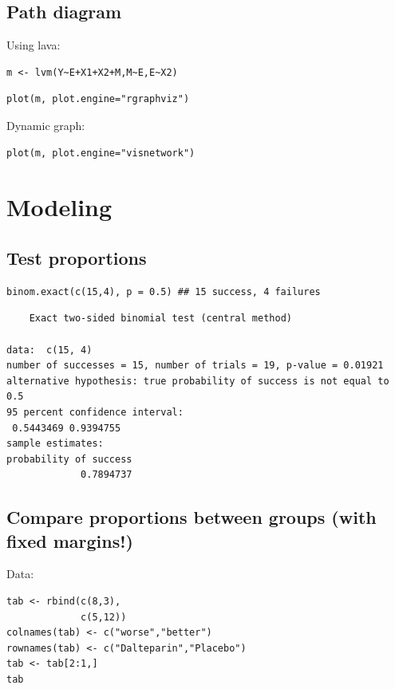 \documentclass{article}
\begin{document}
\subsection{Path diagram}
\label{sec:orge8a8306}
Using lava:
\lstset{language=r,label= ,caption= ,captionpos=b,numbers=none}
\begin{lstlisting}
m <- lvm(Y~E+X1+X2+M,M~E,E~X2)
\end{lstlisting}

\lstset{language=r,label= ,caption= ,captionpos=b,numbers=none}
\begin{lstlisting}
plot(m, plot.engine="rgraphviz")
\end{lstlisting}

Dynamic graph:
\lstset{language=r,label= ,caption= ,captionpos=b,numbers=none}
\begin{lstlisting}
plot(m, plot.engine="visnetwork")
\end{lstlisting}

\section{Modeling}
\label{sec:org167e87d}
\subsection{Test proportions}
\label{sec:orga780cf4}
\lstset{language=r,label= ,caption= ,captionpos=b,numbers=none}
\begin{lstlisting}
binom.exact(c(15,4), p = 0.5) ## 15 success, 4 failures
\end{lstlisting}

\begin{verbatim}
	Exact two-sided binomial test (central method)

data:  c(15, 4)
number of successes = 15, number of trials = 19, p-value = 0.01921
alternative hypothesis: true probability of success is not equal to 0.5
95 percent confidence interval:
 0.5443469 0.9394755
sample estimates:
probability of success 
             0.7894737
\end{verbatim}

\subsection{Compare proportions between groups (with fixed margins!)}
\label{sec:org7c43745}

Data:
\lstset{language=r,label= ,caption= ,captionpos=b,numbers=none}
\begin{lstlisting}
tab <- rbind(c(8,3),
			 c(5,12))
colnames(tab) <- c("worse","better")
rownames(tab) <- c("Dalteparin","Placebo")
tab <- tab[2:1,]
tab
\end{lstlisting}
\end{document}
